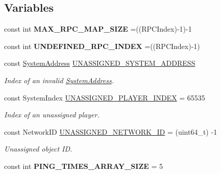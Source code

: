\subsection*{Variables}
\begin{DoxyCompactItemize}
\item 
\hypertarget{namespace_rak_net_a638118e00a7648a35633d2a5cd870a85}{const int {\bfseries M\-A\-X\-\_\-\-R\-P\-C\-\_\-\-M\-A\-P\-\_\-\-S\-I\-Z\-E} =((R\-P\-C\-Index)-\/1)-\/1}\label{namespace_rak_net_a638118e00a7648a35633d2a5cd870a85}

\item 
\hypertarget{namespace_rak_net_a49ebc4ab527b8c56391302c22994f678}{const int {\bfseries U\-N\-D\-E\-F\-I\-N\-E\-D\-\_\-\-R\-P\-C\-\_\-\-I\-N\-D\-E\-X} =((R\-P\-C\-Index)-\/1)}\label{namespace_rak_net_a49ebc4ab527b8c56391302c22994f678}

\item 
\hypertarget{namespace_rak_net_a80c95b4ed53f42911a6fa92b85e929cf}{const \hyperlink{struct_rak_net_1_1_system_address}{System\-Address} \hyperlink{namespace_rak_net_a80c95b4ed53f42911a6fa92b85e929cf}{U\-N\-A\-S\-S\-I\-G\-N\-E\-D\-\_\-\-S\-Y\-S\-T\-E\-M\-\_\-\-A\-D\-D\-R\-E\-S\-S}}\label{namespace_rak_net_a80c95b4ed53f42911a6fa92b85e929cf}

\begin{DoxyCompactList}\small\item\em Index of an invalid \hyperlink{struct_rak_net_1_1_system_address}{System\-Address}. \end{DoxyCompactList}\item 
\hypertarget{namespace_rak_net_a763ec1cdea3634fd4364f003419ec7af}{const System\-Index \hyperlink{namespace_rak_net_a763ec1cdea3634fd4364f003419ec7af}{U\-N\-A\-S\-S\-I\-G\-N\-E\-D\-\_\-\-P\-L\-A\-Y\-E\-R\-\_\-\-I\-N\-D\-E\-X} = 65535}\label{namespace_rak_net_a763ec1cdea3634fd4364f003419ec7af}

\begin{DoxyCompactList}\small\item\em Index of an unassigned player. \end{DoxyCompactList}\item 
\hypertarget{namespace_rak_net_a3fd38ad7440c9f89899a9f54335d5f24}{const Network\-I\-D \hyperlink{namespace_rak_net_a3fd38ad7440c9f89899a9f54335d5f24}{U\-N\-A\-S\-S\-I\-G\-N\-E\-D\-\_\-\-N\-E\-T\-W\-O\-R\-K\-\_\-\-I\-D} = (uint64\-\_\-t) -\/1}\label{namespace_rak_net_a3fd38ad7440c9f89899a9f54335d5f24}

\begin{DoxyCompactList}\small\item\em Unassigned object I\-D. \end{DoxyCompactList}\item 
\hypertarget{namespace_rak_net_aa1f6b57ffe681cefd3d0857552fbcce6}{const int {\bfseries P\-I\-N\-G\-\_\-\-T\-I\-M\-E\-S\-\_\-\-A\-R\-R\-A\-Y\-\_\-\-S\-I\-Z\-E} = 5}\label{namespace_rak_net_aa1f6b57ffe681cefd3d0857552fbcce6}

\end{DoxyCompactItemize}


